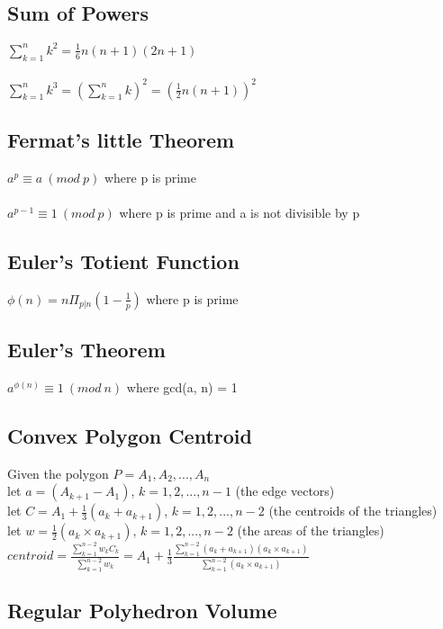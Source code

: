\documentclass[8pt, oneside]{extarticle}
\begin{document}
\begin{multicols}{3}
\subsection{Sum of Powers}

$\sum_{k=1}^nk^2 = \frac{1}{6}n(n+1)(2n+1)$\\
\\
$\sum_{k=1}^nk^3 = (\sum_{k=1}^nk)^2 = (\frac{1}{2}n(n+1))^2$

\subsection{Fermat's little Theorem}

$a^p \equiv a\ (mod\ p)$ where p is prime\\
\\
$a^{p-1} \equiv 1\ (mod\ p)$ where p is prime and a is not divisible by p

\subsection{Euler's Totient Function}

$\phi(n) = n\Pi_{p|n}(1-\frac{1}{p})$ where p is prime

\subsection{Euler's Theorem}

$a^{\phi(n)} \equiv 1\ (mod\ n)$ where gcd(a, n) = 1

\subsection{Convex Polygon Centroid}

Given the polygon $P = A_1,A_2,...,A_n$\\
let $a = (A_{k+1} - A_1)$, $k = 1,2,...,n-1$ (the edge vectors)\\
let $C = A_1 + \frac{1}{3}(a_k + a_{k+1})$, $k = 1,2,...,n-2$ (the centroids of the triangles)\\
let $w = \frac{1}{2}(a_k{\times}a_{k+1})$, $k = 1,2,...,n-2$ (the areas of the triangles)\\
$centroid = \frac{\sum_{k=1}^{n-2}w_kC_k}{\sum_{k=1}^{n-2}w_k} = A_1 + \frac{1}{3}\frac{\sum_{k=1}^{n-2}(a_k+a_{k+1})(a_k{\times}a_{k+1})}{\sum_{k=1}^{n-2}(a_k{\times}a_{k+1})}$

\subsection{Regular Polyhedron Volume}


\end{multicols}
\end{document}
